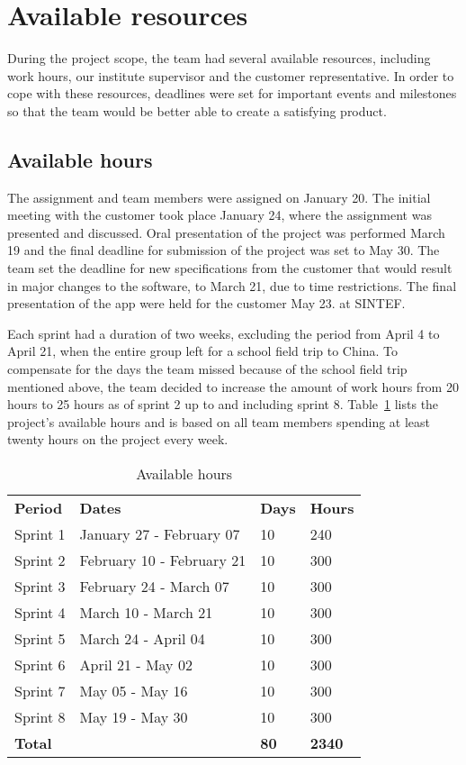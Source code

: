 \newpage
\section{Available resources}
\label{sec:availResources}
During the project scope, the team had several available resources, including work hours, our institute supervisor and the customer representative. In order to cope with these resources, deadlines were set for important events and milestones so that the team would be better able to create a satisfying product.


\subsection{Available hours}

The assignment and team members were assigned on January 20. The initial meeting with the customer took place January 24, where the assignment was presented and discussed. Oral presentation of the project was performed March 19 and the final deadline for submission of the project was set to May 30. The team set the deadline for new specifications from the customer that would result in major changes to the software, to March 21, due to time restrictions. The final presentation of the app were held for the customer May 23. at SINTEF.

Each sprint had a duration of two weeks, excluding the period from April 4 to April 21, when the entire group left for a school field trip to China. To compensate for the days the team missed because of the school field trip mentioned above, the team decided to increase the amount of work hours from 20 hours to 25 hours as of sprint 2 up to and including sprint 8. Table~\ref{tab:availHours} lists the project's available hours and is based on all team members spending at least twenty hours on the project every week.


\begin{table}[H]
\centering
{}
\begin{tabular}{|l|l|l|l|}
\hline
\textbf{Period} & \textbf{Dates} & \textbf{Days} & \textbf{Hours}\\
Sprint 1& January 27 - February 07 & 10  & 240 \\
Sprint 2 & February 10 - February 21 &10  & 300 \\
Sprint 3 & February 24 - March 07 &10 & 300 \\
Sprint 4 & March 10 - March 21 &10  &300 \\
Sprint 5 & March 24 - April 04 &10&  300 \\
Sprint 6 & April 21 - May 02 &10  &300 \\
Sprint 7 & May 05 - May 16 &10  &300 \\
Sprint 8 & May 19 - May 30 &10  &300 \\
\textbf{Total}&& \textbf{80}&  \textbf{2340}\\\hline
\end{tabular}
\caption{Available hours}
\label{tab:availHours}
\end{table}


